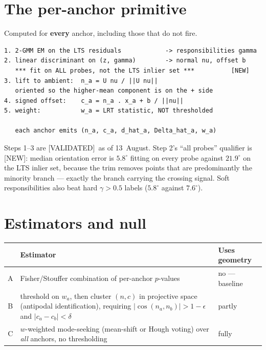 \documentclass[11pt]{article}
\newcommand{\provtag}[2]{{\footnotesize\sffamily\textcolor{#1}{[#2]}}}
\newcommand{\VALID}{\provtag{okgreen}{VALIDATED}}
\newcommand{\NEWT}{\provtag{newmag}{NEW}}
\begin{document}
\section{The per-anchor primitive}

Computed for \textbf{every} anchor, including those that do not fire.

\begin{codebox}
\begin{verbatim}
1. 2-GMM EM on the LTS residuals            -> responsibilities gamma
2. linear discriminant on (z, gamma)        -> normal nu, offset b
   *** fit on ALL probes, not the LTS inlier set ***          [NEW]
3. lift to ambient:  n_a = U nu / ||U nu||
   oriented so the higher-mean component is on the + side
4. signed offset:    c_a = n_a . x_a + b / ||nu||
5. weight:           w_a = LRT statistic, NOT thresholded

   each anchor emits (n_a, c_a, d_hat_a, Delta_hat_a, w_a)
\end{verbatim}
\end{codebox}

\noindent Steps 1--3 are \VALID\ as of 13~August. Step 2's ``all probes'' qualifier is
\NEWT: median orientation error is $5.8^\circ$ fitting on every probe against $21.9^\circ$ on
the LTS inlier set, because the trim removes points that are predominantly the minority branch
--- exactly the branch carrying the crossing signal. Soft responsibilities also beat hard
$\gamma > 0.5$ labels ($5.8^\circ$ against $7.6^\circ$).

\section{Estimators and null}

\begin{table}[h]
\small\centering
\begin{tabular}{@{}cp{}p{}@{}}
\toprule
& \textbf{\sffamily Estimator} & \textbf{\sffamily Uses geometry}\\
\midrule
A & Fisher/Stouffer combination of per-anchor $p$-values & no --- baseline\\
B & threshold on $w_a$, then cluster $(n,c)$ in projective space (antipodal identification),
    requiring $|\cos(n_a,n_b)| > 1-\epsilon$ and $|c_a - c_b| < \delta$ & partly\\
C & $w$-weighted mode-seeking (mean-shift or Hough voting) over \emph{all} anchors, no
    thresholding & fully\\
\bottomrule
\end{tabular}
\end{table}
\end{document}
